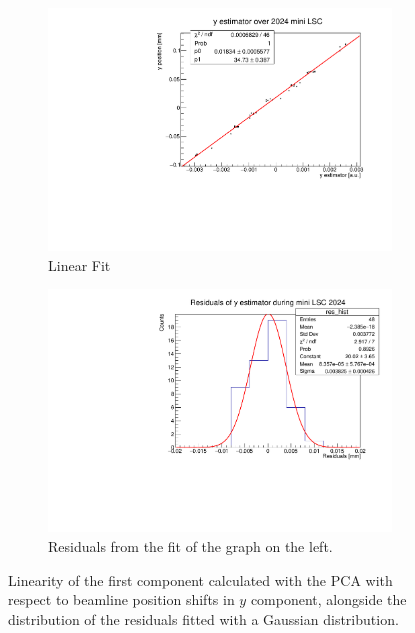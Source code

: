 \begin{figure}
    \centering
    \begin{subfigure}{0.48\textwidth}
    \includegraphics[width=\linewidth]{figures/y_fit_new.pdf}
    \caption{Linear Fit}\label{fig:yfit_data}
    \end{subfigure}
    \begin{subfigure}{0.48\textwidth}
    \includegraphics[width=\linewidth]{figures/y_res_new.pdf}
    \caption{Residuals from the fit of the graph on the left. }\label{fig:yres_data}
    \end{subfigure}
    \caption{Linearity of the first component calculated with the PCA with respect to beamline position shifts in $y$ component, alongside the distribution of the residuals fitted with a Gaussian distribution.}
    \label{fig:y_data}
\end{figure}


